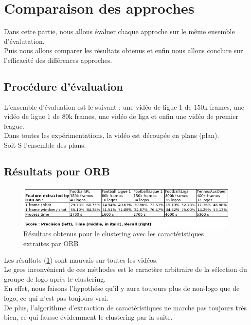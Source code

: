 \documentclass[11pt]{article}
\begin{document}
\newpage
\section{Comparaison des approches}
\label{sec:org469c112}
Dans cette partie, nous allons évaluer chaque approche sur le même ensemble d'évalutation.\\
Puis nous allons comparer les résultats obtenus et enfin nous allons conclure sur l'efficacité des différences approches.\\

\subsection{Procédure d'évaluation}
\label{sec:org9b694a8}
L'ensemble d'évaluation est le suivant : une vidéo de ligue 1 de 150k frames, une vidéo de ligue 1 de 80k frames, une vidéo de liga et enfin une vidéo de premier league.\\
Dans toutes les expérimentations, la vidéo est découpée en plans (plan).\\
Soit S l'ensemble des plans.\\

\subsection{Résultats pour ORB}
\label{sec:orgdb63749}
\begin{figure}[htbp]
\centering
\includegraphics[width=15cm]{res_orb.png}
\caption{Résultats obtenus pour le clustering avec les caractéristiques extraites par ORB \label{orb-res}}
\end{figure}

Les résultats (\ref{orb-res}) sont mauvais sur toutes les vidéos.\\
Le gros inconvénient de ces méthodes est le caractère arbitraire de la sélection du groupe de logo après le clustering.\\
En effet, nous faisons l'hypothése qu'il y aura toujours plus de non-logo que de logo, ce qui n'est pas toujours vrai.\\
De plus, l'algorithme d'extraction de caractèristiques ne marche pas toujours très bien, ce qui fausse évidemment le clustering par la suite.\\
\end{document}
